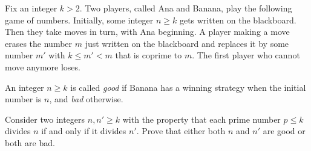 Fix an integer 
$k>2$.
 Two players, called Ana and Banana, play the following game of numbers. Initially, some integer 
$n \ge k$
 gets written on the blackboard. Then they take moves in turn, with Ana beginning. A player making a move erases the number 
$m$
 just written on the blackboard and replaces it by some number 
$m'$
 with 
$k \le m' < m$
 that is coprime to 
$m$.
 The first player who cannot move anymore loses.


An integer 
$n \ge k $
is called \emph{good} if Banana has a winning strategy when the initial number is 
$n$, 
and \emph{bad} otherwise.


Consider two integers 
$n,n' \ge k$
 with the property that each prime number 
$p \le k$
 divides 
$n$
 if and only if it divides 
$n'$.
 Prove that either both 
$n$
 and 
$n'$
 are good or both are bad.
